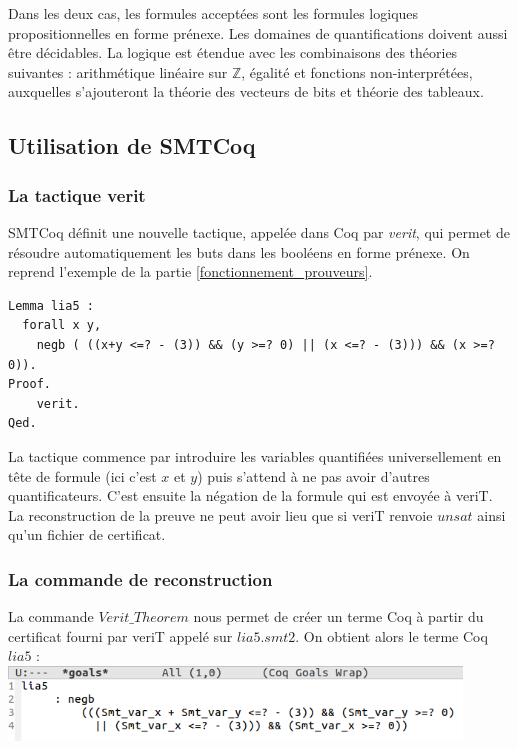 \documentclass[11pt]{article}
\begin{document}
Dans les deux cas, les formules acceptées sont les formules logiques propositionnelles en forme prénexe. Les domaines de quantifications doivent aussi être décidables. La logique est étendue avec les combinaisons des théories suivantes : arithmétique linéaire sur $\mathbb{Z}$, égalité et fonctions non-interprétées, auxquelles s'ajouteront la théorie des vecteurs de bits et théorie des tableaux. 

\subsection{Utilisation de SMTCoq}

\subsubsection{La tactique verit}

SMTCoq définit une nouvelle tactique, appelée dans Coq par \textit{verit}, qui permet de résoudre automatiquement les buts dans les booléens en forme prénexe. On reprend l'exemple de la partie \ref{fonctionnement_prouveurs}.


\begin{lstlisting}[frame=single]
Lemma lia5 : 
  forall x y,
    negb ( ((x+y <=? - (3)) && (y >=? 0) || (x <=? - (3))) && (x >=? 0)).
Proof.
    verit.
Qed.
\end{lstlisting}

La tactique commence par introduire les variables quantifiées universellement en tête de formule (ici c'est $x$ et $y$) puis s'attend à ne pas avoir d'autres quantificateurs. C'est ensuite la négation de la formule qui est envoyée à veriT. La reconstruction de la preuve ne peut avoir lieu que si veriT renvoie $unsat$ ainsi qu'un fichier de certificat.

\subsubsection{La commande de reconstruction}

La commande $Verit\_Theorem$ nous permet de créer un terme Coq à partir du certificat fourni par veriT appelé sur $lia5.smt2$. On obtient alors le terme Coq $lia5$ : \\

\includegraphics[height=2cm]{checklia5.png}
\end{document}
